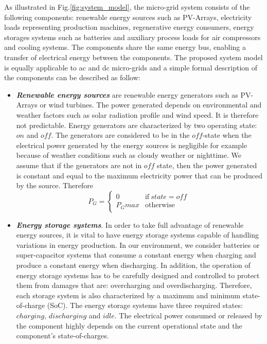 As illustrated in Fig.\ref{fig:system_model}, the micro-grid system consists of the following components: renewable energy sources such as PV-Arrays, electricity loads representing production machines, regenerative energy consumers, energy storages systems such as batteries and auxiliary process loads for air compressors and cooling systems. The components share the same energy bus, enabling a transfer of electrical energy between the components. The proposed system model is equally applicable to ac and dc micro-grids and a simple formal description of the components can be described as follow:
\begin{itemize}
\item{\textit{\textbf{ Renewable energy sources}} are renewable energy generators such as PV-Arrays or wind turbines. The power generated depends on environmental and weather factors such as solar radiation profile and wind speed. It is therefore not predictable. Energy generators are characterized by two operating state:$on$ and $off$. The generators are considered to be in the $off$-state when the electrical power generated by the energy sources is negligible for example because of weather conditions such as cloudy weather or nighttime. We assume that if the generators are not in $off$ state, then the power generated is constant and equal to the maximum electricity power that can be produced by the source. Therefore
%
\begin{equation}
 P_G = 
 \begin{cases}
      0 & \text{if}\ state=off \\
      P_Gmax & \text{otherwise}
    \end{cases} \;
\end{equation}
%
 } 
\item{\textit{\textbf{Energy storage systems}}. In order to take full advantage of renewable energy sources, it is vital to have energy storage systems capable of handling variations in energy production. In our environment, we consider batteries or super-capacitor systems that consume a constant energy when charging and produce a constant energy when discharging. In addition, the operation of energy storage systems has to be carefully designed and controlled to protect them from damages that are: overcharging and overdischarging. Therefore, each storage system is also characterized by a maximum and minimum state-of-charge (SoC). The energy storage systems have three required states: $charging$, $discharging$ and $idle$. The electrical power consumed or released by the component highly depends on the current operational state and the component\rq{s} state-of-charges.}
 

\end{itemize}
